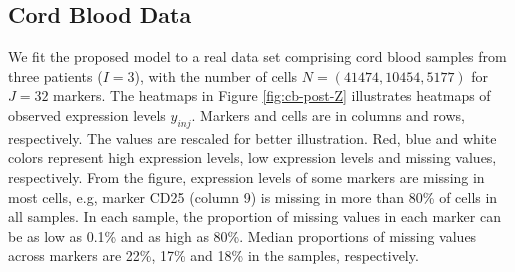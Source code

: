 \documentclass[12pt,]{article}
\begin{document}
\subsection{Cord Blood Data}\label{sec:CB-real}
We fit the proposed model to a real data set comprising cord blood samples from
three patients ($I=3$), with the number of cells $N=(41474, 10454, 5177)$ for $J=32$
markers. The heatmaps in Figure \ref{fig:cb-post-Z} illustrates heatmaps of
observed expression levels $y_{inj}$.  Markers and cells are in columns and
rows, respectively. The values are rescaled for better illustration.  Red, blue and
white colors represent high expression levels, low expression levels and missing
values, respectively.  From the figure, expression levels of some markers are
missing in most cells, e.g, marker CD25 (column 9) is missing in more than 80\%
of cells in all samples.
%
In each sample, the proportion of missing values in each marker can be as low
as 0.1\% and as high as 80\%.  
Median proportions of missing values across markers are 22\%, 17\% and 18\% in the samples, respectively.
\end{document}
